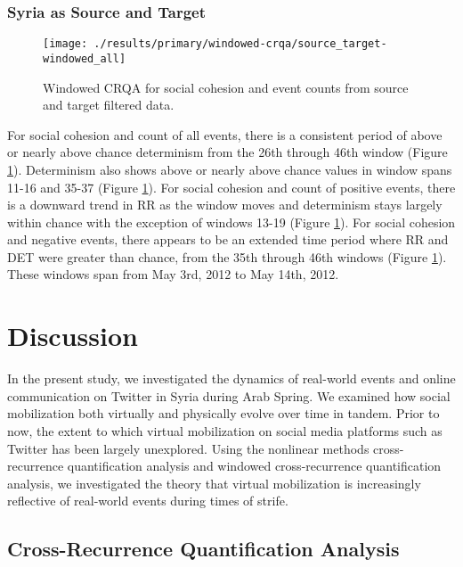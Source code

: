 \documentclass[english,man]{apa6}
\begin{document}
\hypertarget{syria-as-source-and-target-1}{%
\subsubsection{Syria as Source and Target}\label{syria-as-source-and-target-1}}

\begin{figure}
\texttt{[image: ./results/primary/windowed-crqa/source\_target-windowed\_all]} \caption{Windowed CRQA for social cohesion and event counts from source and target filtered data.}\label{fig:plot-wcrqa-source-targ-all}
\end{figure}

For social cohesion and count of all events, there is a consistent period of above or nearly above chance determinism from the 26th through 46th window (Figure \ref{fig:plot-wcrqa-source-targ-all}). Determinism also shows above or nearly above chance values in window spans 11-16 and 35-37 (Figure \ref{fig:plot-wcrqa-source-targ-all}). For social cohesion and count of positive events, there is a downward trend in RR as the window moves and determinism stays largely within chance with the exception of windows 13-19 (Figure \ref{fig:plot-wcrqa-source-targ-all}). For social cohesion and negative events, there appears to be an extended time period where RR and DET were greater than chance, from the 35th through 46th windows (Figure \ref{fig:plot-wcrqa-source-targ-all}). These windows span from May 3rd, 2012 to May 14th, 2012.

\hypertarget{discussion}{%
\section{Discussion}\label{discussion}}

In the present study, we investigated the dynamics of real-world events and online communication on Twitter in Syria during Arab Spring. We examined how social mobilization both virtually and physically evolve over time in tandem. Prior to now, the extent to which virtual mobilization on social media platforms such as Twitter has been largely unexplored. Using the nonlinear methods cross-recurrence quantification analysis and windowed cross-recurrence quantification analysis, we investigated the theory that virtual mobilization is increasingly reflective of real-world events during times of strife.

\hypertarget{cross-recurrence-quantification-analysis-2}{%
\subsection{Cross-Recurrence Quantification Analysis}\label{cross-recurrence-quantification-analysis-2}}
\end{document}
